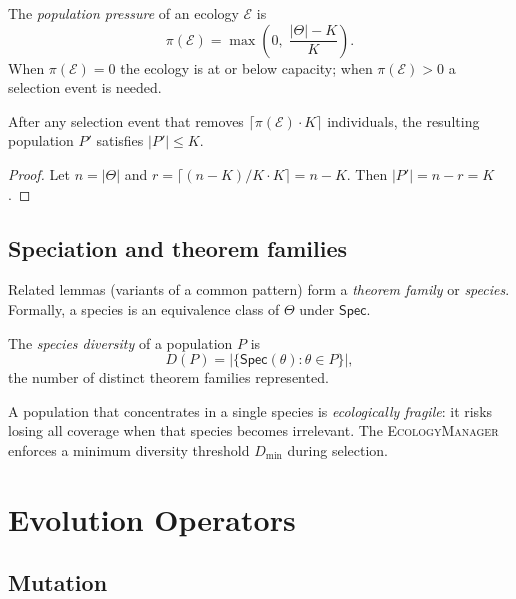 \documentclass[11pt]{article}
\providecommand{\Eco}{\mathcal{E}}          %
\providecommand{\Cap}{K}                    %
\providecommand{\Spc}{\mathsf{Spec}}        %
\providecommand{\EcoMgr}{\textsc{EcologyManager}} %
\begin{document}
\begin{definition}\label{def:pressure}
The \emph{population pressure} of an ecology $\Eco$ is
\[
  \pi(\Eco) = \max\!\left(0,\; \frac{|\Theta| - \Cap}{\Cap}\right).
\]
When $\pi(\Eco) = 0$ the ecology is at or below capacity;
when $\pi(\Eco) > 0$ a selection event is needed.
\end{definition}

\begin{proposition}\label{prop:bounded}
After any selection event that removes $\lceil\pi(\Eco)\cdot\Cap\rceil$
individuals, the resulting population $P'$ satisfies $|P'| \leq \Cap$.
\end{proposition}
\begin{proof}
Let $n = |\Theta|$ and $r = \lceil(n-\Cap)/\Cap\cdot\Cap\rceil = n - \Cap$.
Then $|P'| = n - r = \Cap$.
\end{proof}

\subsection{Speciation and theorem families}

Related lemmas (variants of a common pattern) form a
\emph{theorem family} or \emph{species}.  Formally, a species is an
equivalence class of $\Theta$ under $\Spc$.

\begin{definition}\label{def:diversity}
The \emph{species diversity} of a population $P$ is
\[
  D(P) = |\{\Spc(\theta) : \theta \in P\}|,
\]
\ie the number of distinct theorem families represented.
\end{definition}

A population that concentrates in a single species is
\emph{ecologically fragile}: it risks losing all coverage when that
species becomes irrelevant.  The \EcoMgr{} enforces a minimum
diversity threshold $D_{\min}$ during selection.

\section{Evolution Operators}\label{sec:evolution}

\subsection{Mutation}
\end{document}
